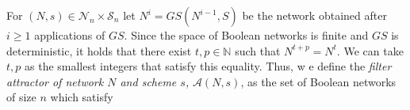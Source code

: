 \documentclass[preprint,12pt]{elsarticle}
\newcommand{\STG}{\textit{STG}}
\newcommand{\GS}{\textit{GS}}
\begin{document}

For $(N,s) \in \mathcal{N}_n\times \mathcal{S}_n$ let $N^{i} = \GS(N^{i-1},S)$ be the network obtained after $i\geq 1$ applications of $\GS$. %
Since the space of Boolean networks is finite and %
$\GS$ is deterministic, %
it holds that there exist $t, p \in \mathbb{N}$ such that
$N^{t+ p} =N^{t}$. %
We can take $t, p$ as the smallest integers that satisfy this equality. Thus, w%
e define the \textit{filter attractor of network $N$ and scheme $s$, }$\mathcal{A}(N,s)$, as the set of Boolean networks of size $n$ which satisfy
\end{document}
